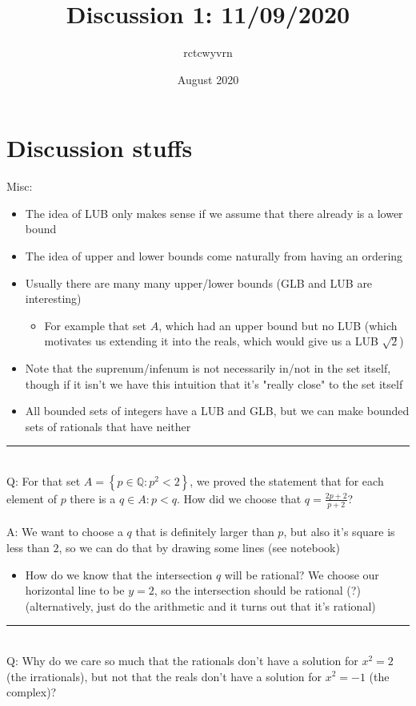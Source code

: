 \documentclass{article}
\title{Discussion 1: 11/09/2020}
\author{rctcwyvrn}
\date{August 2020}
\newcommand{\Q}{\mathbb{Q}}
\begin{document}
\maketitle


\section{Discussion stuffs}
Misc:
\begin{itemize}
	\item The idea of LUB only makes sense if we assume that there already is a lower bound
	\item The idea of upper and lower bounds come naturally from having an ordering
	\item Usually there are many many upper/lower bounds (GLB and LUB are interesting)
	\begin{itemize}
		\item For example that set $A$, which had an upper bound but no LUB (which motivates us extending it into the reals, which would give us a LUB $\sqrt{2}$) 
	\end{itemize}
	\item Note that the suprenum/infenum is not necessarily in/not in the set itself, though if it isn't we have this intuition that it's "really close" to the set itself
	\item All bounded sets of integers have a LUB and GLB, but we can make bounded sets of rationals that have neither
\end{itemize}
\bigskip
\hrule
\bigskip
~\\
Q: For that set $A = \left\{ p\in\Q: p^2<2\right\}$, we proved the statement that for each element of $p$ there is a $q\in A: p<q$. How did we choose that $q=\frac{2p+2}{p+2}$? \\
~\\
A: We want to choose a $q$ that is definitely larger than $p$, but also it's square is less than $2$, so we can do that by drawing some lines (see notebook)
\begin{itemize}
	\item How do we know that the intersection $q$ will be rational? We choose our horizontal line to be $y=2$, so the intersection should be rational (?) (alternatively, just do the arithmetic and it turns out that it's rational)
\end{itemize}
\bigskip
\hrule
\bigskip
~\\
Q: Why do we care so much that the rationals don't have a solution for $x^2=2$ (the irrationals), but not that the reals don't have a solution for $x^2=-1$ (the complex)? ~\\
\end{document}
